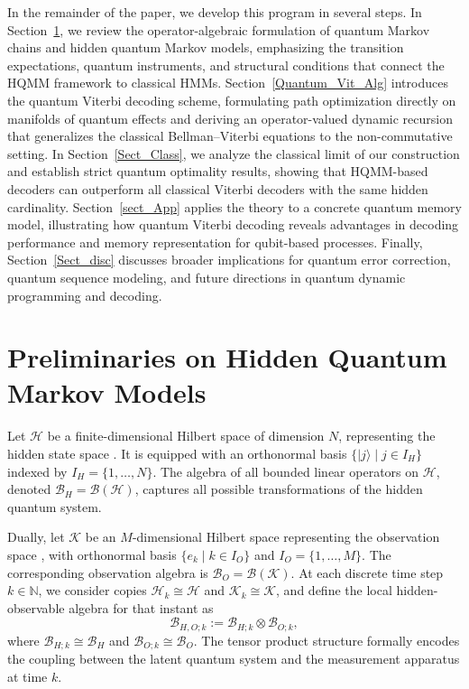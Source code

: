 \documentclass[12pt, reco]{article}
\begin{document}
In the remainder of the paper, we develop this program in several steps. In Section~\ref{sect-preli}, we review the operator-algebraic formulation of quantum Markov chains and hidden quantum Markov models, emphasizing the transition expectations, quantum instruments, and structural conditions that connect the HQMM framework to classical HMMs. Section~\ref{Quantum_Vit_Alg} introduces the quantum Viterbi decoding scheme, formulating path optimization directly on manifolds of quantum effects and deriving an operator-valued dynamic recursion that generalizes the classical Bellman–Viterbi equations to the non-commutative setting. In Section~\ref{Sect_Class}, we analyze the classical limit of our construction and establish strict quantum optimality results, showing that HQMM-based decoders can outperform all classical Viterbi decoders with the same hidden cardinality. Section~\ref{sect_App} applies the theory to a concrete quantum memory model, illustrating how quantum Viterbi decoding reveals advantages in decoding performance and memory representation for qubit-based processes. Finally, Section~\ref{Sect_disc} discusses broader implications for quantum error correction, quantum sequence modeling, and future directions in quantum dynamic programming and decoding.


\section{Preliminaries on Hidden Quantum Markov  Models}\label{sect-preli}



Let \(\mathcal{H}\) be a finite-dimensional Hilbert space of dimension \(N\), representing the  hidden state space . It is equipped with an orthonormal basis \(\{|j\rangle \mid j \in I_H\}\) indexed by \(I_H = \{1, \dots, N\}\). The algebra of all bounded linear operators on \(\mathcal{H}\), denoted \(\mathcal{B}_H = \mathcal{B}(\mathcal{H})\), captures all possible transformations of the hidden quantum system.

Dually, let \(\mathcal{K}\) be an \(M\)-dimensional Hilbert space representing the  observation space , with orthonormal basis \(\{e_k \mid k \in I_O\}\) and \(I_O = \{1, \dots, M\}\). The corresponding observation algebra is \(\mathcal{B}_O = \mathcal{B}(\mathcal{K})\). At each discrete time step \(k \in \mathbb{N}\), we consider copies \(\mathcal{H}_k \cong \mathcal{H}\) and \(\mathcal{K}_k \cong \mathcal{K}\), and define the local  hidden-observable algebra  for that instant as
\[
\mathcal{B}_{H,O;k} := \mathcal{B}_{H;k} \otimes \mathcal{B}_{O;k},
\]
where \(\mathcal{B}_{H;k} \cong \mathcal{B}_H\) and \(\mathcal{B}_{O;k} \cong \mathcal{B}_O\). The tensor product structure formally encodes the coupling between the latent quantum system and the measurement apparatus at time \(k\).
\end{document}
